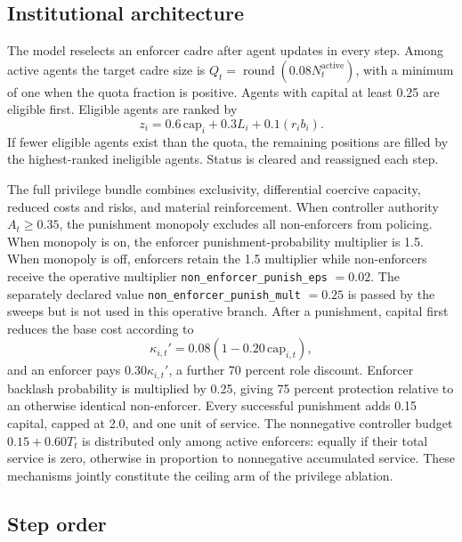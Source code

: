 \documentclass[12pt]{article}
\begin{document}
\subsection{Institutional architecture}

The model reselects an enforcer cadre after agent updates in every step. Among active agents the target cadre size is \(Q_t=\operatorname{round}(0.08N_t^{\mathrm{active}})\), with a minimum of one when the quota fraction is positive. Agents with capital at least 0.25 are eligible first. Eligible agents are ranked by
\begin{equation}
 z_i=0.6\,\mathrm{cap}_i+0.3L_i+0.1(r_ib_i).
\end{equation}
If fewer eligible agents exist than the quota, the remaining positions are filled by the highest-ranked ineligible agents. Status is cleared and reassigned each step.

The full privilege bundle combines exclusivity, differential coercive capacity, reduced costs and risks, and material reinforcement. When controller authority \(A_t\geq0.35\), the punishment monopoly excludes all non-enforcers from policing. When monopoly is on, the enforcer punishment-probability multiplier is 1.5. When monopoly is off, enforcers retain the 1.5 multiplier while non-enforcers receive the operative multiplier \texttt{non\_enforcer\_punish\_eps} \(=0.02\). The separately declared value \texttt{non\_enforcer\_punish\_mult} \(=0.25\) is passed by the sweeps but is not used in this operative branch. After a punishment, capital first reduces the base cost according to
\begin{equation}
 \kappa_{i,t}'=0.08\left(1-0.20\,\mathrm{cap}_{i,t}\right),
\end{equation}
and an enforcer pays \(0.30\kappa_{i,t}'\), a further 70 percent role discount. Enforcer backlash probability is multiplied by 0.25, giving 75 percent protection relative to an otherwise identical non-enforcer. Every successful punishment adds 0.15 capital, capped at 2.0, and one unit of service. The nonnegative controller budget \(0.15+0.60T_t\) is distributed only among active enforcers: equally if their total service is zero, otherwise in proportion to nonnegative accumulated service. These mechanisms jointly constitute the ceiling arm of the privilege ablation.

\subsection{Step order}
\end{document}
